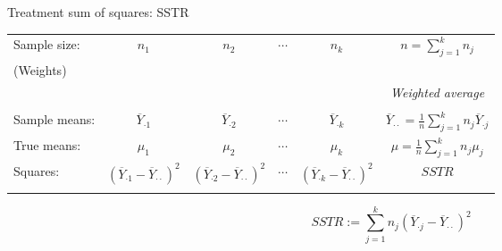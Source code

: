 \begin{frame}[fragile]{Treatment sum of squares: SSTR}
	\begin{center}
		\begin{tabular}{l|cccc|c} \hline
Sample size:  & $n_1$                                                                               & $n_2$                                                                               & $\cdots$ & $n_k$                                                                               & $n=\sum_{j=1}^k n_j$                                                         \\
(Weights)     &                                                                                     &                                                                                     &          &                                                                                     &                                                                              \\
              &                                                                                     &                                                                                     &          &                                                                                     & {\it Weighted average}                                                       \\ \hline \\ [1em]
Sample means: & $\overline{Y}_{\cdot 1}$                                                            & $\overline{Y}_{\cdot 2}$                                                            & $\cdots$ & $\overline{Y}_{\cdot k}$                                                            & $\overline{Y}_{\cdot \cdot}=\frac 1n \sum_{j=1}^kn_j \overline{Y}_{\cdot j}$ \\ [2em]
True means:   & $\mu_1$                                                                             & $\mu_2$                                                                             & $\cdots$ & $\mu_k$                                                                             & $\mu=\frac 1n \sum_{j=1}^kn_j \mu_j$                                         \\ [2em]
Squares:      & $\scriptscriptstyle\left(\overline{Y}_{\cdot 1}-\overline{Y}_{\cdot\cdot}\right)^2$ & $\scriptscriptstyle\left(\overline{Y}_{\cdot 2}-\overline{Y}_{\cdot\cdot}\right)^2$ & $\cdots$ & $\scriptscriptstyle\left(\overline{Y}_{\cdot k}-\overline{Y}_{\cdot\cdot}\right)^2$ & $SSTR$
\\
\\
\hline
		\end{tabular}
	\end{center}
	\vfill
	\[
		SSTR := \sum_{j=1}^k n_j  \left(\overline{Y}_{\cdot j}-\overline{Y}_{\cdot\cdot}\right)^2
	\]
\end{frame}
